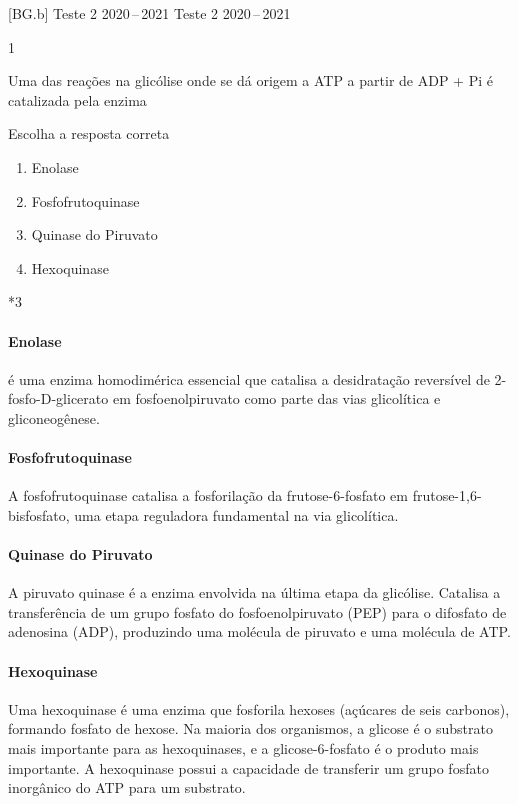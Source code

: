 \documentclass[\mainfilename]{subfiles}
\begin{document}
[BG.b]
{Teste 2 2020\,--\,2021}
{Teste 2 2020\,--\,2021}

\setcounter{question}{2}
\begin{questionBox}1{}
    
    Uma das reações na glicólise onde se dá origem a ATP a partir de ADP + Pi é catalizada pela enzima

    Escolha a resposta correta
    \begin{enumerate}
        \item Enolase
        \item Fosfofrutoquinase
        \item Quinase do Piruvato
        \item Hexoquinase
    \end{enumerate}

    \vspace{-5ex}

    \begin{questionBox}*3{}
        
        \paragraph{Enolase}
        é uma enzima homodimérica essencial que catalisa a desidratação reversível de 2-fosfo-D-glicerato em fosfoenolpiruvato como parte das vias glicolítica e gliconeogênese.\\

        \paragraph{Fosfofrutoquinase}
        A fosfofrutoquinase catalisa a fosforilação da frutose-6-fosfato em frutose-1,6-bisfosfato, uma etapa reguladora fundamental na via glicolítica.\\

        \paragraph{Quinase do Piruvato}
        A piruvato quinase é a enzima envolvida na última etapa da glicólise. Catalisa a transferência de um grupo fosfato do fosfoenolpiruvato (PEP) para o difosfato de adenosina (ADP), produzindo uma molécula de piruvato e uma molécula de ATP.\\

        \paragraph{Hexoquinase}
        Uma hexoquinase é uma enzima que fosforila hexoses (açúcares de seis carbonos), formando fosfato de hexose. Na maioria dos organismos, a glicose é o substrato mais importante para as hexoquinases, e a glicose-6-fosfato é o produto mais importante. A hexoquinase possui a capacidade de transferir um grupo fosfato inorgânico do ATP para um substrato.
        

\end{questionBox}
\end{questionBox}
\end{document}

